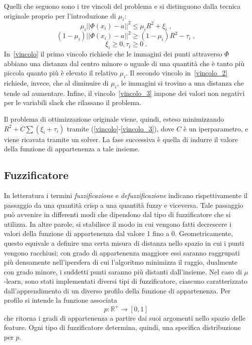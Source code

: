 \documentclass[12pt]{report}
\theoremstyle{definition}
\begin{document}
Quelli che seguono sono i tre vincoli del problema e si distinguono dalla tecnica originale proprio per l'introduzione di $\mu_i$:
\begin{equation}\label{vincolo}
    \mu_i || \mathit{\Phi}(x_i) - a ||^2 \leq \mu_iR^2 + \xi_i \;,
\end{equation}
\begin{equation}\label{vincolo_2}
    (1 - \mu_i) || \mathit{\Phi}(x_i) - a ||^2 \geq (1 - \mu_i)R^2 - \tau_i \;,
\end{equation}
\begin{equation}\label{vincolo_3}
    \xi_i \geq 0, \tau_i \geq 0 \;.
\end{equation}
In~\ref{vincolo} il primo vincolo richiede che le immagini dei punti attraverso $\mathit{\Phi}$ abbiano una distanza dal centro minore o uguale di una quantità che è tanto più piccola quanto più è elevato il relativo $\mu_i$. Il secondo vincolo in~\ref{vincolo_2} richiede, invece, che al diminuire di $\mu_i$, le immagini si trovino a una distanza che tende ad aumentare. Infine, il vincolo~\ref{vincolo_3} impone dei valori non negativi per le variabili slack che rilassano il problema.

Il problema di ottimizzazione originale viene, quindi, esteso minimizzando $R^2 + C\sum(\xi_i + \tau_i)$ tramite (\ref{vincolo}-\ref{vincolo_3}), dove $C$ è un iperparametro, e viene ricavata tramite un solver.
La fase successiva è quella di indurre il valore della funzione di appartenenza a tale insieme.

\subsection{Fuzzificatore} \label{fuzzificatore}
In letteratura i termini \textit{fuzzificazione} e \textit{defuzzificazione} indicano rispettivamente il passaggio da una quantità crisp a una quantità fuzzy e viceversa.
Tale passaggio può avvenire in differenti modi che dipendono dal tipo di fuzzificatore che si utilizza. 
In altre parole, si stabilisce il modo in cui vengono fatti decrescere i valori della funzione di appartenenza dal valore 1 fino a 0. Geometricamente, questo equivale a definire una certa misura di distanza nello spazio in cui i punti vengono racchiusi; con grado di appartenenza maggiore essi saranno raggrupati più densamente nell'ipersfera di cui l'algoritmo minimizza il raggio, dualmente con grado minore, i suddetti punti saranno più distanti dall'insieme.
Nel caso di $\mu$-learn, sono stati implementati diversi tipi di fuzzificatore, ciascuno caratterizzato dall'apprendimento di un diverso profilo della funzione di appartenenza. Per profilo si intende la funzione associata 
\begin{equation}
    p: \mathbb{R}^+ \rightarrow [0,1]
\end{equation}
che ritorna i gradi di appartenenza a partire dai suoi argomenti nello spazio delle feature. Ogni tipo di fuzzificatore determina, quindi, una specifica distribuzione per $p$.
\end{document}
